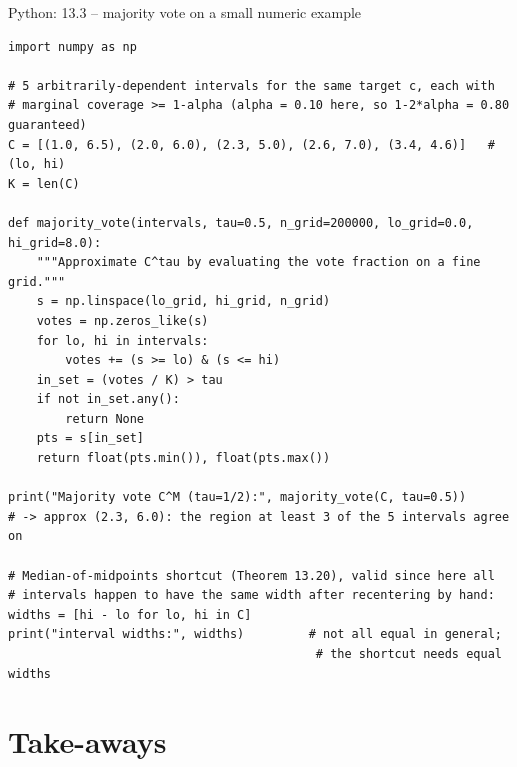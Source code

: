 \documentclass[aspectratio=169,10pt]{beamer}
\begin{document}
\begin{frame}[fragile]{Python: 13.3 -- majority vote on a small numeric example}
  \begin{lstlisting}
import numpy as np

# 5 arbitrarily-dependent intervals for the same target c, each with
# marginal coverage >= 1-alpha (alpha = 0.10 here, so 1-2*alpha = 0.80 guaranteed)
C = [(1.0, 6.5), (2.0, 6.0), (2.3, 5.0), (2.6, 7.0), (3.4, 4.6)]   # (lo, hi)
K = len(C)

def majority_vote(intervals, tau=0.5, n_grid=200000, lo_grid=0.0, hi_grid=8.0):
    """Approximate C^tau by evaluating the vote fraction on a fine grid."""
    s = np.linspace(lo_grid, hi_grid, n_grid)
    votes = np.zeros_like(s)
    for lo, hi in intervals:
        votes += (s >= lo) & (s <= hi)
    in_set = (votes / K) > tau
    if not in_set.any():
        return None
    pts = s[in_set]
    return float(pts.min()), float(pts.max())

print("Majority vote C^M (tau=1/2):", majority_vote(C, tau=0.5))
# -> approx (2.3, 6.0): the region at least 3 of the 5 intervals agree on

# Median-of-midpoints shortcut (Theorem 13.20), valid since here all
# intervals happen to have the same width after recentering by hand:
widths = [hi - lo for lo, hi in C]
print("interval widths:", widths)         # not all equal in general;
                                           # the shortcut needs equal widths
  \end{lstlisting}
\end{frame}

\section{Take-aways}
\end{document}
